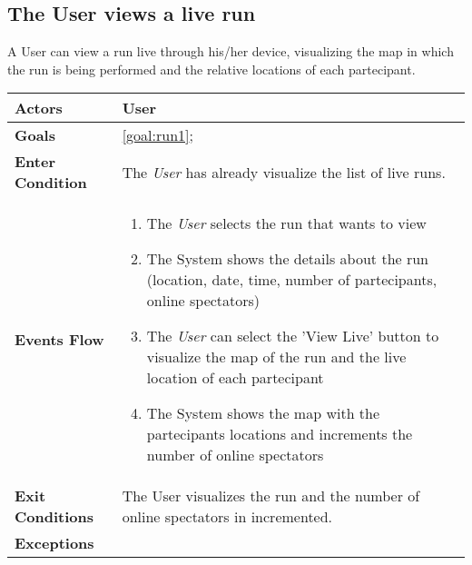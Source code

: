   \subsection{The User views a live run}
A User can view a run live through his/her device, visualizing the map in which the run is being performed and the relative locations of each partecipant.

\begin{table}[H]
	\centering
    
    \begin{tabular}{|p{3.5cm}|p{10.3cm}|}
    
    \hline
    \textbf{\large{Actors}}  			& \tabitem User 	\\
    				 					
    \hline
    \textbf{\large{Goals}} 				& \ref{goal:run1};\\
    
    \hline
    \textbf{\large{Enter Condition}}	& The \emph{User} has already visualize the list of live runs.		\\
    
    \hline
    \textbf{\large{Events Flow}}		& \begin{enumerate}[leftmargin=0.5cm]
                                          	\item The \emph{User}  selects the run that wants to view
                                            \item The System shows the details about the run (location, date, time, number of partecipants, online spectators)
                                             \item The \emph{User} can select the 'View Live' button to visualize the map of the run and the live location of each partecipant
                                            \item The System shows the map with the partecipants locations and increments the number of online spectators
                                           
                                          \end{enumerate}
    										\\
    \hline
    \textbf{\large{Exit Conditions}}    & The User visualizes the run and the number of online spectators in incremented.  \\
    
    \hline
    \textbf{\large{Exceptions}} 		& \\
    
    \hline
    
    
    \end{tabular}
	
\end{table}